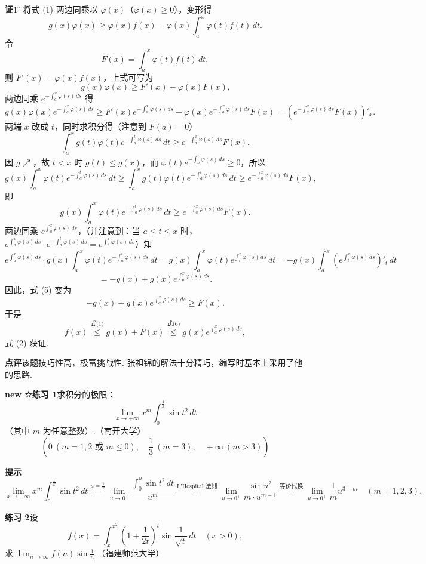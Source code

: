 \documentclass[UTF8, 12pt, fontset=fandol, oneside]{ctexart}
\begin{document}
\noindent\textbf{证}\quad $1^\circ$ 将式 (1) 两边同乘以 $\varphi(x)$（$\varphi(x)\ge0$），变形得
\[
g(x)\varphi(x)\ge \varphi(x)f(x)-\varphi(x)\int_a^x\varphi(t)f(t)\,dt.
\]
令
\[
F(x)=\int_a^x\varphi(t)f(t)\,dt,
\]
则 $F'(x)=\varphi(x)f(x)$，上式可写为
\[
g(x)\varphi(x)\ge F'(x)-\varphi(x)F(x).
\]
两边同乘 $e^{-\int_a^x\varphi(s)\,ds}$ 得
\[
g(x)\varphi(x)e^{-\int_a^x\varphi(s)\,ds}
\ge F'(x)e^{-\int_a^x\varphi(s)\,ds}
-\varphi(x)e^{-\int_a^x\varphi(s)\,ds}F(x)
=\left(e^{-\int_a^x\varphi(s)\,ds}F(x)\right)'_x.
\tag{3}
\]
两端 $x$ 改成 $t$，同时求积分得（注意到 $F(a)=0$）
\[
\int_a^x g(t)\varphi(t)e^{-\int_a^t\varphi(s)\,ds}\,dt
\ge e^{-\int_a^x\varphi(s)\,ds}F(x).
\tag{4}
\]
因 $g\nearrow$，故 $t<x$ 时 $g(t)\le g(x)$，而 $\varphi(t)e^{-\int_a^t\varphi(s)\,ds}\ge0$，所以
\[
g(x)\int_a^x\varphi(t)e^{-\int_a^t\varphi(s)\,ds}\,dt
\ge \int_a^x g(t)\varphi(t)e^{-\int_a^t\varphi(s)\,ds}\,dt
\ge e^{-\int_a^x\varphi(s)\,ds}F(x),
\]
即
\[
g(x)\int_a^x\varphi(t)e^{-\int_a^t\varphi(s)\,ds}\,dt
\ge e^{-\int_a^x\varphi(s)\,ds}F(x).
\tag{5}
\]
两边同乘 $e^{\int_a^x\varphi(s)\,ds}$，（并注意到：当 $a\le t\le x$ 时，$e^{\int_a^x\varphi(s)\,ds}\cdot e^{-\int_a^t\varphi(s)\,ds}=e^{\int_t^x\varphi(s)\,ds}$）知
\[
e^{\int_a^x\varphi(s)\,ds}\cdot g(x)\int_a^x\varphi(t)e^{-\int_a^t\varphi(s)\,ds}\,dt
=g(x)\int_a^x\varphi(t)e^{\int_t^x\varphi(s)\,ds}\,dt
=-g(x)\int_a^x\left(e^{\int_t^x\varphi(s)\,ds}\right)'_t\,dt
\]
\[
=-g(x)+g(x)e^{\int_a^x\varphi(s)\,ds}.
\]
因此，式 (5) 变为
\[
-g(x)+g(x)e^{\int_a^x\varphi(s)\,ds}\ge F(x).
\tag{6}
\]
于是
\[
f(x)\stackrel{\text{式(1)}}{\le}g(x)+F(x)
\stackrel{\text{式(6)}}{\le}g(x)e^{\int_a^x\varphi(s)\,ds},
\]
式 (2) 获证.

\noindent\textbf{点评}\quad 该题技巧性高，极富挑战性. 张祖锦的解法十分精巧，编写时基本上采用了他的思路.

\noindent\textbf{new ☆练习 1}\quad 求积分的极限：
\[
\lim_{x\to+\infty}x^m\int_0^{\frac1x}\sin t^2\,dt
\]
（其中 $m$ 为任意整数）.（南开大学）
\[
\left(0\ (m=1,2\text{ 或 }m\le0),\quad \frac13\ (m=3),\quad +\infty\ (m>3)\right)
\]

\noindent\textbf{提示}\quad
\[
\lim_{x\to+\infty}x^m\int_0^{\frac1x}\sin t^2\,dt
\overset{u=\frac1x}{=}
\lim_{u\to0^+}\frac{\int_0^u\sin t^2\,dt}{u^m}
\overset{\text{L'Hospital 法则}}{=}
\lim_{u\to0^+}\frac{\sin u^2}{m\cdot u^{m-1}}
\overset{\text{等价代换}}{=}
\lim_{u\to0^+}\frac1m u^{3-m}\quad(m=1,2,3).
\]

\noindent\textbf{练习 2}\quad 设
\[
f(x)=\int_x^{x^2}\left(1+\frac1{2t}\right)^t\sin\frac1{\sqrt{t}}\,dt\quad(x>0),
\]
求 $\lim_{n\to\infty}f(n)\sin\frac1n$.（福建师范大学）
\end{document}
